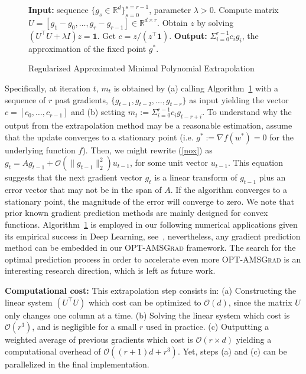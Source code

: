 \documentclass[wcp]{jmlr}
\begin{document}
\begin{figure}\vspace{-0.3in}
\begin{minipage}{\linewidth}
\begin{algorithm}[H]
\begin{algorithmic}[1] 
\small
\caption{Regularized Approximated Minimal Polynomial Extrapolation \citep{SAB16} } \label{alg:algex}
\STATE \textbf{Input:} sequence $\{ g_s \in \mathbb R^d \}_{s=0}^{s=r-1}$, parameter $\lambda > 0$.
\STATE Compute matrix  $U = [ g_1 - g_0, \dots, g_{r} - g_{r-1}] \in \mathbb R^{d \times r}$.
\STATE Obtain $z$ by solving $(U^\top U + \lambda I ) z = \mathbf{1}$.
\STATE Get $c= z / (z^\top \mathbf{1})$.
\STATE \textbf{Output:} $\Sigma_{i=0}^{r-1} c_i g_i$, the approximation of the fixed point $g^*$.
\end{algorithmic}
\end{algorithm}
\end{minipage}\end{figure}


Specifically, at iteration $t$, $m_t$ is obtained by \textsf{(a)} calling Algorithm~\ref{alg:algex} with a sequence of $r$ past gradients, $\{ g_{t-1},g_{t-2}, \dots, g_{t-r} \}$ as input yielding the vector $c = [c_0, \dots, c_{r-1}] $ and \textsf{(b)} setting $m_t:= \Sigma_{i=0}^{r-1} c_i g_{t-r+i}$.
To understand why the output from the extrapolation method may be a reasonable estimation, assume that the update converges to a stationary point (i.e. $g^*:=\nabla f(w^*) = 0$ for the underlying function $f$). Then, we might rewrite (\ref{nox}) as $g_t = A g_{t-1}  + \mathcal{O}( \| g_{t-1} \|_2^2 ) u_{t-1}$, for some unit vector $u_{t-1}$.
This equation suggests that the next gradient vector $g_{t}$ is a linear transform of $g_{{t-1}}$ plus an error vector that may not be in the span of $A$.
If the algorithm converges to a stationary point, the magnitude of the error will converge to zero. 
We note that prior known gradient prediction methods are mainly designed for convex functions.
Algorithm~\ref{alg:algex} is employed in our following numerical applications given its empirical success in Deep Learning, see~\cite{Scieur18}, nevertheless, any gradient prediction method can be embedded in our \textsc{OPT-AMSGrad} framework.
The search for the optimal prediction process in order to accelerate even more \textsc{OPT-AMSGrad} is an interesting research direction, which is left as future work.

\textbf{Computational cost:}
 This extrapolation step consists in: \textsf{(a)} Constructing the linear system $(U^\top U)$ which cost can be optimized to $\mathcal{O}(d)$, since the matrix $U$ only changes one column at a time. \textsf{(b)} Solving the linear system which cost is $\mathcal{O}(r^3)$, and is negligible for a small $r$ used in practice.\textsf{ (c)} Outputting a weighted average of previous gradients which cost is $\mathcal{O}(r \times d)$ yielding a computational overhead of $\mathcal O\left((r+1)d+r^3\right)$.
Yet, steps \textsf{(a)} and \textsf{(c)} can be parallelized in the final implementation.
\end{document}
